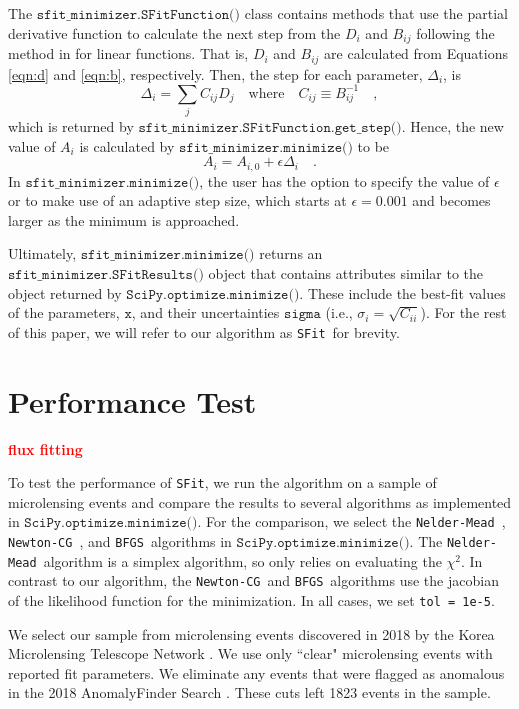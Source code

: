\documentclass[preprint]{aastex631}
\newcommand{\HL}[1]{\textcolor{red}{\bf#1}}
\newcommand{\minimize}{$\texttt{SciPy.optimize.minimize()}$}
\newcommand{\neldarmead}{\texttt{Nelder-Mead}}
\newcommand{\newtoncg}{\texttt{Newton-CG}}
\newcommand{\bfgs}{\texttt{BFGS}}
\newcommand{\sfit}{\texttt{SFit}}
\begin{document}
The $\texttt{sfit\_minimizer.SFitFunction()}$ class contains methods that use the partial derivative function to calculate the next step from the $D_i$ and $B_{ij}$ following the method in \citet{Gould03} for linear functions. That is, $D_i$ and $B_{ij}$ are calculated from Equations \ref{eqn:d} and \ref{eqn:b}, respectively. Then, the step for each parameter, $\Delta_i$, is
\begin{equation}
\Delta_i = \sum_j C_{ij} D_j \quad \mathrm{where} \quad C_{ij} \equiv B^{-1}_{ij} \quad,
\end{equation}
which is returned by $\texttt{sfit\_minimizer.SFitFunction.get\_step()}$.
Hence, the new value of $A_i$ is calculated by $\texttt{sfit\_minimizer.minimize()}$ to be
\begin{equation}
A_i = A_{i, 0} + \epsilon \Delta_i \quad . 
\end{equation}
In  $\texttt{sfit\_minimizer.minimize()}$, the user has the option to specify the value of $\epsilon$ or to make use of an adaptive step size, which starts at $\epsilon = 0.001$ and becomes larger as the minimum is approached.

Ultimately, $\texttt{sfit\_minimizer.minimize()}$ returns an $\texttt{sfit\_minimizer.SFitResults()}$ object that contains attributes similar to the object returned by \minimize. These include the best-fit values of the parameters, $\texttt{x}$, and their uncertainties $\texttt{sigma}$ (i.e., $\sigma_i = \sqrt{C_{ii}}$). For the rest of this paper, we will refer to our algorithm as \sfit\, for brevity.


\section{Performance Test}

\HL{flux fitting}

To test the performance of \sfit, we run the algorithm on a sample of microlensing events and compare the results to several algorithms as implemented in \minimize. For the comparison, we select the \neldarmead\, \citep{NelderMead}, \newtoncg\, \citep{QuasiNewtonMethods}, and \bfgs\, \citep{QuasiNewtonMethods} algorithms in \minimize. The \neldarmead\, algorithm is a simplex algorithm, so only relies on evaluating the $\chi^2$. In contrast to our algorithm, the \newtoncg\, and \bfgs\, algorithms use the jacobian of the likelihood function for the minimization. In all cases, we set \texttt{tol = 1e-5}.

We select  our sample from microlensing events discovered in 2018 by the Korea Microlensing Telescope Network \citep[KMTNet;][]{KimKim18_EF, Kim18EF,Kim18_AF}. We use only ``clear" microlensing events with reported fit parameters. We eliminate any events that were flagged as anomalous in the 2018 AnomalyFinder Search \citep[although possible finite source or buried host events were left in the sample;][]{Gould22AF5,Jung22AF6}. These cuts left 1823 events in the sample. 
\end{document}
